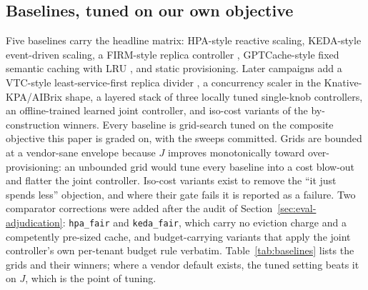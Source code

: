 \subsection{Baselines, tuned on our own objective}
\label{sec:method-baselines}

Five baselines carry the headline matrix: HPA-style reactive scaling,
KEDA-style event-driven scaling, a FIRM-style replica controller
\citep{firm2020}, GPTCache-style fixed semantic caching with LRU
\citep{gptcache2023}, and static provisioning. Later campaigns add a
VTC-style least-service-first replica divider \citep{vtc2024}, a
concurrency scaler in the Knative-KPA/AIBrix shape, a layered stack of
three locally tuned single-knob controllers, an offline-trained learned
joint controller, and iso-cost variants of the by-construction winners.
Every baseline is grid-search tuned on the composite objective this paper
is graded on, with the sweeps committed. Grids are bounded at a
vendor-sane envelope because $J$ improves monotonically toward
over-provisioning: an unbounded grid would tune every baseline into a cost
blow-out and flatter the joint controller. Iso-cost variants exist to
remove the ``it just spends less'' objection, and where their gate fails
it is reported as a failure. Two comparator corrections were added after
the audit of Section~\ref{sec:eval-adjudication}: \texttt{hpa\_fair} and
\texttt{keda\_fair}, which carry no eviction charge and a competently
pre-sized cache, and budget-carrying variants that apply the joint
controller's own per-tenant budget rule verbatim.
Table~\ref{tab:baselines} lists the grids and their winners; where a
vendor default exists, the tuned setting beats it on $J$, which is the
point of tuning.

